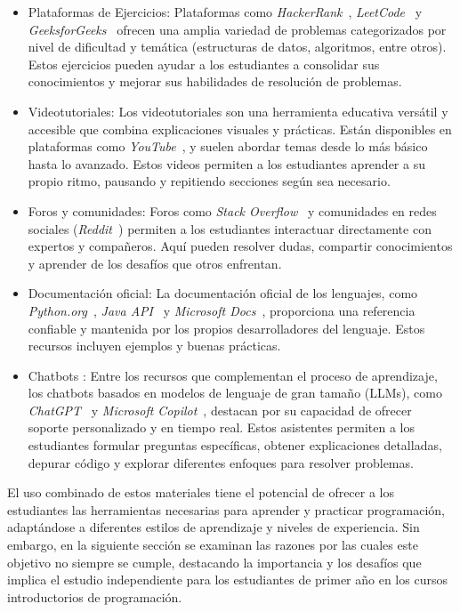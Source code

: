 \documentclass{article}
\begin{document}
\begin{itemize}
    \item Plataformas de Ejercicios: 
    Plataformas como \textit{HackerRank}~\cite{hackerrank}, \textit{LeetCode}~\cite{leetcode}  y \textit{GeeksforGeeks}~\cite{geeksforgeeks} ofrecen una amplia variedad de problemas categorizados por nivel de dificultad y temática (estructuras de datos, algoritmos, entre otros). Estos ejercicios pueden ayudar a los estudiantes a consolidar sus conocimientos y mejorar sus habilidades de resolución de problemas.

    \item Videotutoriales:
    Los videotutoriales son una herramienta educativa versátil y accesible que combina explicaciones visuales y prácticas. Están disponibles en plataformas como \textit{YouTube}~\cite{youtube}, y suelen abordar temas desde lo más básico hasta lo avanzado. Estos videos permiten a los estudiantes aprender a su propio ritmo, pausando y repitiendo secciones según sea necesario.

    \item Foros y comunidades: 
    Foros como \textit{Stack Overflow}~\cite{stackoverflow} y comunidades en redes sociales (\textit{Reddit}~\cite{reddit}) permiten a los estudiantes interactuar directamente con expertos y compañeros. Aquí pueden resolver dudas, compartir conocimientos y aprender de los desafíos que otros enfrentan.
    
    \item Documentación oficial:
    La documentación oficial de los lenguajes, como \textit{Python.org}~\cite{python}, \textit{Java API}~\cite{java-api} y \textit{Microsoft Docs}~\cite{microsoft-docs}, proporciona una referencia confiable y mantenida por los propios desarrolladores del lenguaje. Estos recursos incluyen ejemplos y buenas prácticas.
    
    \item Chatbots : Entre los recursos que complementan el proceso de aprendizaje, los chatbots basados en modelos de lenguaje de gran tamaño (LLMs), como \textit{ChatGPT}~\cite{chatgpt} y \textit{Microsoft Copilot}~\cite{copilot}, destacan por su capacidad de ofrecer soporte personalizado y en tiempo real. Estos asistentes permiten a los estudiantes formular preguntas específicas, obtener explicaciones detalladas, depurar código y explorar diferentes enfoques para resolver problemas.
\end{itemize}

El uso combinado de estos materiales tiene el potencial de ofrecer a los estudiantes las herramientas necesarias para aprender y practicar programación, adaptándose a diferentes estilos de aprendizaje y niveles de experiencia. Sin embargo, en la siguiente sección se examinan las razones por las cuales este objetivo no siempre se cumple, destacando la importancia y los desafíos que implica el estudio independiente para los estudiantes de primer año en los cursos introductorios de programación.
\end{document}
